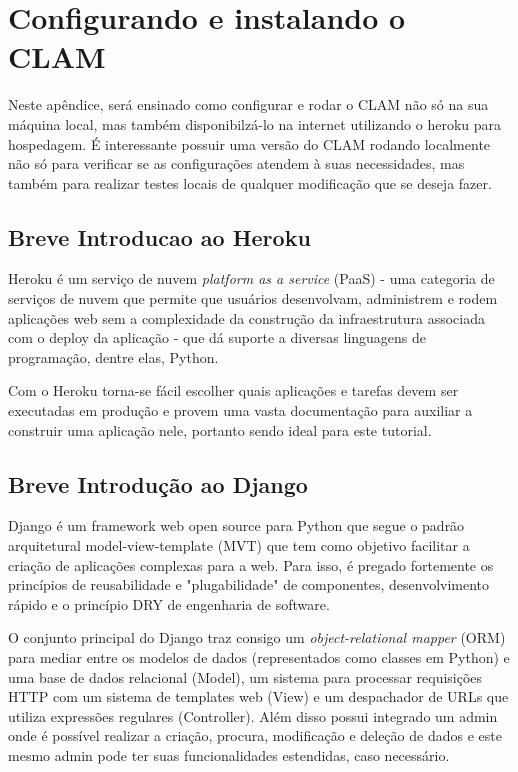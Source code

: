 \chapter{Configurando e instalando o CLAM}

Neste apêndice, será ensinado como configurar e rodar o CLAM não só na sua máquina
local, mas também disponibilzá-lo na internet utilizando o heroku para hospedagem.
É interessante possuir uma versão do CLAM rodando localmente não só para verificar
se as configurações atendem à suas necessidades, mas também para realizar testes locais
de qualquer modificação que se deseja fazer.

\section{Breve Introducao ao Heroku}

Heroku é um serviço de nuvem \textit{platform as a service} (PaaS) -  uma categoria de serviços de
nuvem que permite que usuários desenvolvam, administrem e rodem aplicações web sem a complexidade
da construção da infraestrutura associada com o deploy da aplicação -  que dá suporte a diversas
linguagens de programação, dentre elas, Python.

Com o Heroku torna-se fácil escolher quais aplicações e tarefas devem ser executadas em produção e
provem uma vasta documentação para auxiliar a construir uma aplicação nele, portanto sendo ideal
para este tutorial.

\section{Breve Introdução ao Django}

Django é um framework web open source para Python que segue o padrão arquitetural model-view-template
(MVT) que tem como objetivo facilitar a criação de aplicações complexas para a web. Para isso, é 
pregado fortemente os princípios de reusabilidade e "plugabilidade" de componentes, desenvolvimento
rápido e o princípio DRY de engenharia de software.

O conjunto principal do Django traz consigo um \textit{object-relational mapper} (ORM) para mediar
entre os modelos de dados (representados como classes em Python) e uma base de dados relacional 
(Model), um sistema para processar requisições HTTP com um sistema de templates web (View) e um
despachador de URLs que utiliza expressões regulares (Controller). Além disso possui integrado
um admin onde é possível realizar a criação, procura, modificação e deleção de dados e este mesmo
admin pode ter suas funcionalidades estendidas, caso necessário.

